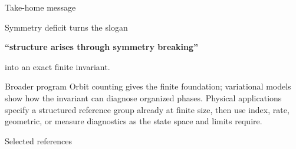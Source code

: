 \begin{frame}{Take-home message}
  \begin{center}
    {\Large
      \textcolor{RelBlue}{Symmetry deficit turns the slogan}

      \vspace{0.5em}
      \textbf{``structure arises through symmetry breaking''}

      \vspace{0.5em}
      \textcolor{RelBlue}{into an exact finite invariant.}}
  \end{center}

  \vspace{1em}
  \begin{block}{Broader program}
    Orbit counting gives the finite foundation; variational models show how the
    invariant can diagnose organized phases. Physical applications specify a
    structured reference group already at finite size, then use index, rate,
    geometric, or measure diagnostics as the state space and limits require.
  \end{block}
\end{frame}

\begin{frame}[allowframebreaks]{Selected references}
  \scriptsize
  
  
\end{frame}
